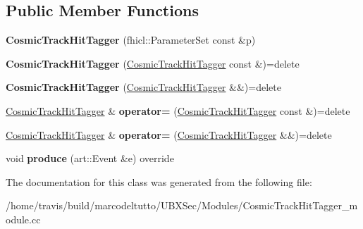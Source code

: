 \subsection*{Public Member Functions}
\begin{DoxyCompactItemize}
\item 
\hypertarget{classCosmicTrackHitTagger_ac6a0456ac0a13fd69a9ff4b02882f0a5}{{\bfseries Cosmic\-Track\-Hit\-Tagger} (fhicl\-::\-Parameter\-Set const \&p)}\label{classCosmicTrackHitTagger_ac6a0456ac0a13fd69a9ff4b02882f0a5}

\item 
\hypertarget{classCosmicTrackHitTagger_a13c4dc2408621b6f4de50f08254025c8}{{\bfseries Cosmic\-Track\-Hit\-Tagger} (\hyperlink{classCosmicTrackHitTagger}{Cosmic\-Track\-Hit\-Tagger} const \&)=delete}\label{classCosmicTrackHitTagger_a13c4dc2408621b6f4de50f08254025c8}

\item 
\hypertarget{classCosmicTrackHitTagger_a319a011ab3346cea74fc81df39cc9cc7}{{\bfseries Cosmic\-Track\-Hit\-Tagger} (\hyperlink{classCosmicTrackHitTagger}{Cosmic\-Track\-Hit\-Tagger} \&\&)=delete}\label{classCosmicTrackHitTagger_a319a011ab3346cea74fc81df39cc9cc7}

\item 
\hypertarget{classCosmicTrackHitTagger_aa68ec7260c542d56f781add788855053}{\hyperlink{classCosmicTrackHitTagger}{Cosmic\-Track\-Hit\-Tagger} \& {\bfseries operator=} (\hyperlink{classCosmicTrackHitTagger}{Cosmic\-Track\-Hit\-Tagger} const \&)=delete}\label{classCosmicTrackHitTagger_aa68ec7260c542d56f781add788855053}

\item 
\hypertarget{classCosmicTrackHitTagger_a2283b66a71b24975ef28369064440062}{\hyperlink{classCosmicTrackHitTagger}{Cosmic\-Track\-Hit\-Tagger} \& {\bfseries operator=} (\hyperlink{classCosmicTrackHitTagger}{Cosmic\-Track\-Hit\-Tagger} \&\&)=delete}\label{classCosmicTrackHitTagger_a2283b66a71b24975ef28369064440062}

\item 
\hypertarget{classCosmicTrackHitTagger_a6ffc6038717475e1887296c8b4fbacae}{void {\bfseries produce} (art\-::\-Event \&e) override}\label{classCosmicTrackHitTagger_a6ffc6038717475e1887296c8b4fbacae}

\end{DoxyCompactItemize}


The documentation for this class was generated from the following file\-:\begin{DoxyCompactItemize}
\item 
/home/travis/build/marcodeltutto/\-U\-B\-X\-Sec/\-Modules/Cosmic\-Track\-Hit\-Tagger\-\_\-module.\-cc\end{DoxyCompactItemize}
